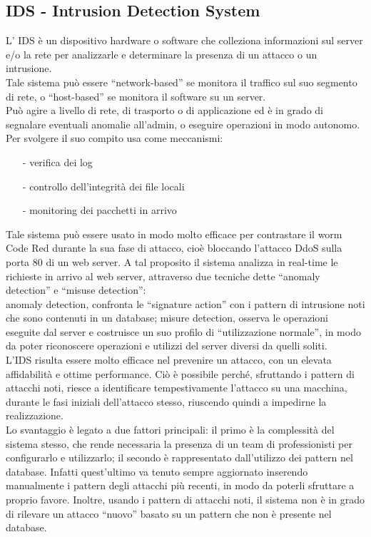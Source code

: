 \subsection{IDS - Intrusion Detection System}
L’ IDS è un dispositivo hardware o software che colleziona informazioni sul server e/o la rete per analizzarle e determinare la presenza di un attacco o un intrusione.\\
Tale sistema può essere “network-based” se monitora il traffico sul suo segmento di rete, o “host-based” se monitora il software su un server.\\
Può agire a livello di rete, di trasporto o di applicazione ed è in grado di segnalare eventuali anomalie all’admin, o eseguire operazioni in modo autonomo.\\
Per svolgere il suo compito usa come meccanismi:
\begin{itemize}
\item[-]verifica dei log
\item[-]controllo dell’integrità dei file locali
\item[-]monitoring dei pacchetti in arrivo
\end{itemize}
Tale sistema può essere usato in modo molto efficace per contrastare il worm Code Red durante la sua fase di attacco, cioè bloccando l'attacco DdoS sulla porta 80 di un web server. A tal proposito il sistema analizza in real-time le richieste in arrivo al web server, attraverso due tecniche dette “anomaly detection” e “misuse detection”:\\
anomaly detection, confronta le “signature action” con i pattern di intrusione noti che sono contenuti in un database;
misure detection, osserva le operazioni eseguite dal server e costruisce un suo profilo di “utilizzazione normale”, in modo da poter riconoscere operazioni e utilizzi del server diversi da quelli soliti.\\
L’IDS risulta essere molto efficace nel prevenire un attacco, con un elevata affidabilità e ottime performance. Ciò è possibile perché, sfruttando i pattern di attacchi noti, riesce a identificare tempestivamente l’attacco su una macchina, durante le fasi iniziali dell’attacco stesso, riuscendo quindi a impedirne la realizzazione.\\
Lo svantaggio è legato a due fattori principali: il primo è la complessità del sistema stesso, che rende necessaria la presenza di un team di professionisti per configurarlo e utilizzarlo; il secondo è rappresentato dall’utilizzo dei pattern nel database. Infatti quest’ultimo va tenuto sempre aggiornato inserendo manualmente i pattern degli attacchi più recenti, in modo da poterli sfruttare a proprio favore. Inoltre, usando i pattern di attacchi noti, il sistema non è in grado di rilevare un attacco “nuovo” basato su un pattern che non è presente nel database.\\
